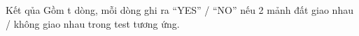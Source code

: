 Kết qủa  
Gồm t dòng, mỗi dòng ghi ra “YES” / “NO” nếu 2 mảnh đất giao nhau / không giao nhau trong test tương ứng.